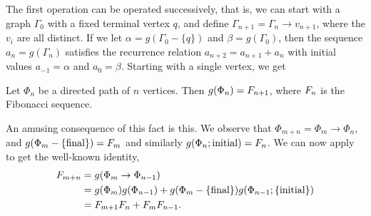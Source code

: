 The first operation can be operated successively, that is, we can start with a graph $\Gamma_0$ with a fixed terminal vertex $q$, and define $\Gamma_{n + 1} = \Gamma_{n} \rightarrow v_{n + 1}$, where the $v_i$ are all distinct. If we let $\alpha = g(\Gamma_0 - \{q\})$ and $\beta = g(\Gamma_0)$, then the sequence $a_n = g(\Gamma_n)$ satisfies the recurrence relation $a_{n + 2} = a_{n + 1} + a_n$ with initial values $a_{-1} = \alpha$ and $a_0 = \beta$. Starting with a single vertex, we get

\begin{prop}
	Let $\Phi_n$ be a directed path of $n$ vertices. Then $g(\Phi_n) = F_{n + 1}$, where $F_{n}$ is the Fibonacci sequence.
\end{prop}

An amusing consequence of this fact is this. We observe that $\Phi_{m + n} = \Phi_m \rightarrow \Phi_n$, and $g(\Phi_m - \{\text{final}\}) = F_{m}$ and similarly $g(\Phi_n; \text{initial}) = F_{n}$.
We can now apply  to get the well-known identity, \eqnspace
\begin{align*}
	F_{m + n} &= g(\Phi_m \rightarrow \Phi_{n - 1}) \\
	&= g(\Phi_m)g(\Phi_{n - 1}) + g(\Phi_m - \{\text{final}\})g(\Phi_{n - 1}; \{\text{initial}\}) \\
	&= F_{m + 1}F_{n} + F_{m}F_{n - 1}.
\end{align*}
